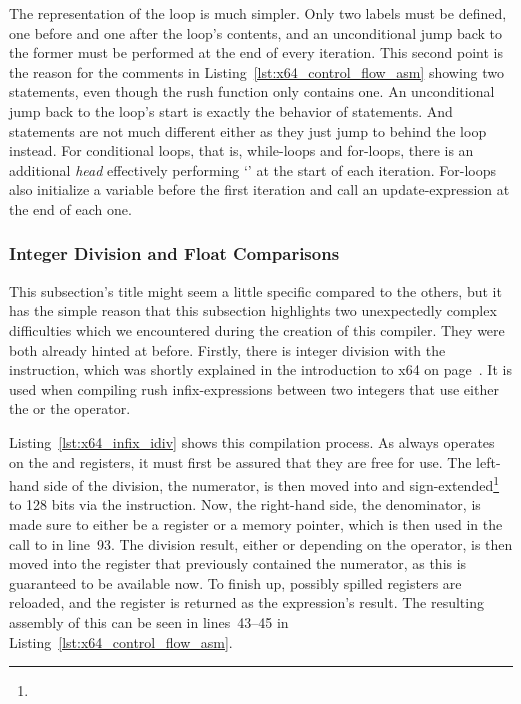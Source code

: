 The representation of the loop is much simpler.
Only two labels must be defined, one before and one after the loop's contents, and an unconditional jump back to the former must be performed at the end of every iteration.
This second point is the reason for the comments in Listing~\ref{lst:x64_control_flow_asm} showing two  statements, even though the rush function only contains one.
An unconditional jump back to the loop's start is exactly the behavior of  statements.
And  statements are not much different either as they just jump to behind the loop instead.
For conditional loops, that is, while-loops and for-loops, there is an additional \emph{head} effectively performing `' at the start of each iteration.
For-loops also initialize a variable before the first iteration and call an update-expression at the end of each one.

\subsubsection{Integer Division and Float Comparisons}

This subsection's title might seem a little specific compared to the others, but it has the simple reason that this subsection highlights two unexpectedly complex difficulties which we encountered during the creation of this compiler.
They were both already hinted at before.
Firstly, there is integer division with the  instruction, which was shortly explained in the introduction to x64 on page~\pageref{x64_idiv}.
It is used when compiling rush infix-expressions between two integers that use either the \qVerb{/} or the \qVerbCmd{\%} operator.


Listing~\ref{lst:x64_infix_idiv} shows this compilation process.
As  always operates on the  and  registers, it must first be assured that they are free for use.
The left-hand side of the division, the numerator, is then moved into  and sign-extended\footnote{} to 128 bits via the  instruction.
Now, the right-hand side, the denominator, is made sure to either be a register or a memory pointer, which is then used in the call to  in line~93.
The division result, either  or  depending on the operator, is then moved into the register that previously contained the numerator, as this is guaranteed to be available now.
To finish up, possibly spilled registers are reloaded, and the register is returned as the expression's result.
The resulting assembly of this can be seen in lines~43--45 in Listing~\ref{lst:x64_control_flow_asm}.

